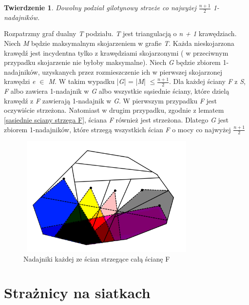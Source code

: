 \documentclass[brudnopis]{xmgr}
\newtheorem{Twierdzenie}{Twierdzenie}
\begin{document}
\begin{Twierdzenie}
  Dowolny podział gilotynowy strzeże co najwyżej $\frac{n+1}{2}$ 1-nadajników.
\end{Twierdzenie}
\indent Rozpatrzmy graf dualny \textit{T} podziału. \textit{T} jest triangulacją o \textit{n + 1} krawędziach. Niech \textit{M} będzie maksymalnym skojarzeniem w grafie \textit{T}. Każda nieskojarzona krawędź jest incydentna tylko z krawędziami skojarzonymi ( w przeciwnym przypadku skojarzenie nie byłoby maksymalne). Niech \textit{G} będzie zbiorem 1-nadajników, uzyskanych przez rozmieszczenie ich w pierwszej skojarzonej krawędzi \textit{e $\in$ M}. W takim wypadku |\textit{G}| = |\textit{M}| $\le \frac{n+1}{2}$. Dla każdej ściany \textit{F} z \textit{S}, \textit{F} albo zawiera 1-nadajnik w \textit{G} albo wszystkie sąsiednie ściany, które dzielą krawędź z \textit{F} zawierają 1-nadajnik w \textit{G}. W pierwszym przypadku \textit{F} jest oczywiście strzeżona. Natomiast w drugim przypadku, zgodnie z lematem \ref{sasiednie sciany strzega F}, ściana \textit{F} również jest strzeżona. Dlatego \textit{G} jest zbiorem 1-nadajników, które strzegą wszystkich ścian \textit{F} o mocy co najwyżej $\frac{n+1}{2}$
\begin{figure}[ht!]
  \centering
  \label{pokrycie f}
  \includegraphics[width=9cm,height=6cm]{rysunki/pokrycie_f.png}
  \caption{Nadajniki każdej ze ścian strzegące całą ścianę F}
  \vspace{6in}
\end{figure} 

\chapter{Strażnicy na siatkach}
\end{document}
